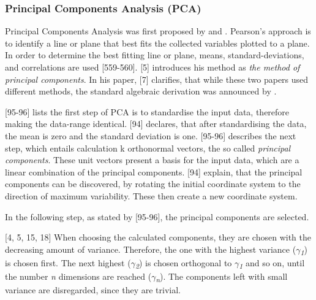 \subsubsection{Principal Components Analysis (PCA)}
Principal Components Analysis was first proposed by \textcite{OnLinesAndPlanes1901} and \textcite{hotelling1933analysis}.
Pearson's approach is to identify a line or plane that best fits the collected variables plotted to a plane. In order to determine the best fitting line or plane, means, standard-deviations, and correlations are used \autocite{OnLinesAndPlanes1901}[559-560].
\textcite{hotelling1933analysis}[5] introduces his method as \textit{the method of principal components}. In his paper, \textcite{jolliffe2002PCA}[7] clarifies, that while these two papers used different methods, the standard algebraic
derivation was announced by \textcite{hotelling1933analysis}.

\textcite{han2011data}[95-96] lists the first step of PCA is to standardise the input data, therefore making the data-range identical. \textcite{DataMiningAndPredictiveAnalytics}[94] declares, that after standardising the data, the mean is zero and the standard deviation is one.
\textcite{han2011data}[95-96] describes the next step, which entails calculation k orthonormal vectors, the so called \textit{principal components}. These unit vectors present a basis for the input data, which are a linear combination of the principal components. \textcite{DataMiningAndPredictiveAnalytics}[94] explain, that the principal components can be discovered, by rotating the initial coordinate system to the direction of maximum variability. These then create a new coordinate system.

In the following step, as stated by \textcite{han2011data}[95-96], the principal components are selected. 


\textcite{hotelling1933analysis}[4, 5, 15, 18] When choosing the calculated components, they are chosen with the decreasing amount of variance. Therefore, the one with the highest variance (\textit{$\gamma$\textsubscript{1}}) is chosen first. The next highest (\textit{$\gamma$\textsubscript{2}}) is chosen orthogonal to \textit{$\gamma$\textsubscript{1}} and so on, until the number \textit{n} dimensions are reached (\textit{$\gamma$\textsubscript{n}}). The components left with small variance are disregarded, since they are trivial. 



